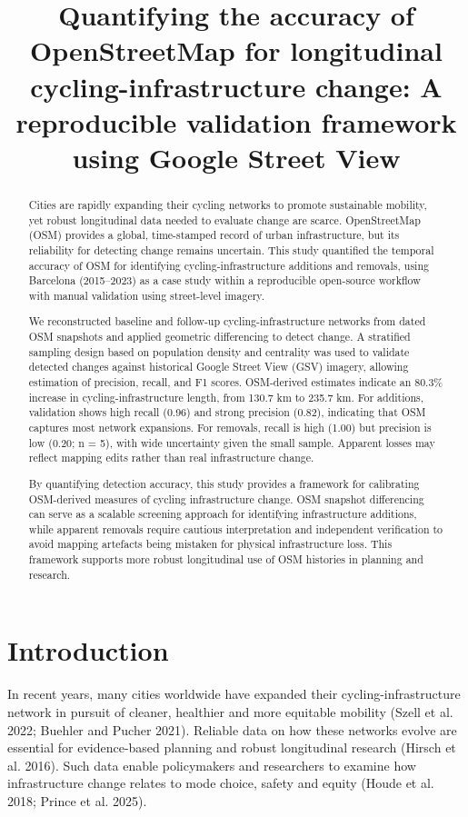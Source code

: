 \documentclass[
]{article}
\title{Quantifying the accuracy of OpenStreetMap for longitudinal
cycling-infrastructure change: A reproducible validation framework using
Google Street View}
\author{}
\date{}
\begin{document}
\maketitle
\begin{abstract}
Cities are rapidly expanding their cycling networks to promote
sustainable mobility, yet robust longitudinal data needed to evaluate
change are scarce. OpenStreetMap (OSM) provides a global, time-stamped
record of urban infrastructure, but its reliability for detecting change
remains uncertain. This study quantified the temporal accuracy of OSM
for identifying cycling-infrastructure additions and removals, using
Barcelona (2015--2023) as a case study within a reproducible open-source
workflow \color{black}with manual validation using street-level
imagery\color{black}.

We reconstructed baseline and follow-up cycling-infrastructure networks
from dated OSM snapshots and applied geometric differencing to detect
change. A stratified sampling design based on population density and
centrality was used to validate detected changes against historical
Google Street View (GSV) imagery, allowing estimation of precision,
recall, and F1 scores. OSM-derived estimates indicate an 80.3\% increase
in cycling-infrastructure length, from 130.7 km to 235.7 km. For
additions, validation shows high recall (0.96) and strong precision
(0.82), indicating that OSM captures most network expansions. For
removals, recall is high (1.00) but precision is low (0.20;
\color{black}n = 5), with wide uncertainty given the small
sample\color{black}. Apparent losses may reflect mapping edits rather
than real infrastructure change.

By quantifying detection accuracy, this study provides a framework for
calibrating OSM-derived measures of cycling infrastructure change. OSM
snapshot differencing can serve as a scalable screening approach for
identifying infrastructure additions, while apparent removals require
cautious interpretation and independent verification to avoid mapping
artefacts being mistaken for physical infrastructure loss. This
framework supports more robust longitudinal use of OSM histories in
planning and research.
\end{abstract}


\section{Introduction}\label{introduction}

In recent years, many cities worldwide have expanded their
cycling-infrastructure network in pursuit of cleaner, healthier and more
equitable mobility (Szell et al. 2022; Buehler and Pucher 2021).
Reliable data on how these networks evolve are essential for
evidence-based planning and robust longitudinal research (Hirsch et al.
2016). Such data enable policymakers and researchers to examine how
infrastructure change relates to mode choice, safety and equity (Houde
et al. 2018; Prince et al. 2025).
\end{document}

